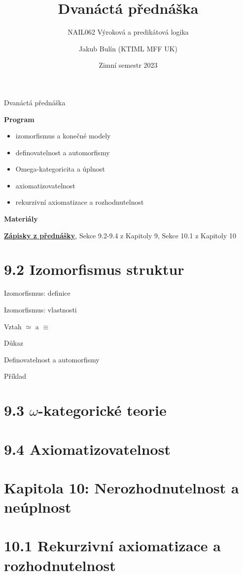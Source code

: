 \documentclass{beamer}
\title{Dvanáctá přednáška}
\subtitle{NAIL062 Výroková a predikátová logika}
\author{Jakub Bulín (KTIML MFF UK)}
\date{Zimní semestr 2023}
\begin{document}
\frame{\titlepage}


\begin{frame}{Dvanáctá přednáška}

    \textbf{Program}
        \begin{itemize}
            \item izomorfismus a konečné modely
            \item definovatelnost a automorfismy
            \item Omega-kategoricita a úplnost
            \item axiomatizovatelnost
            \item rekurzivní axiomatizace a rozhodnutelnost
        \end{itemize}

    \textbf{Materiály}

        \href{https://github.com/jbulin-mff-uk/nail062/raw/main/lecture/lecture-notes/lecture-notes.pdf}{\alert{\textbf{Zápisky z přednášky}}}, Sekce 9.2-9.4 z Kapitoly 9, Sekce 10.1 z Kapitoly 10

\end{frame}


\section{9.2 Izomorfismus struktur}


\begin{frame}{Izomorfismus: definice}
        

\end{frame}


\begin{frame}{Izomorfismus: vlastnosti}
        

\end{frame}


\begin{frame}{Vztah $\simeq$ a $\equiv$}
        

\end{frame}


\begin{frame}{Důkaz}

    
\end{frame}


\begin{frame}{Definovatelnost a automorfismy}

    
\end{frame}


\begin{frame}{Příklad}

    
\end{frame}


\section{9.3 $\omega$-kategorické teorie}


\section{9.4 Axiomatizovatelnost}


\section{\sc Kapitola 10: Nerozhodnutelnost a neúplnost}


\section{10.1 Rekurzivní axiomatizace a rozhodnutelnost}
\end{document}
